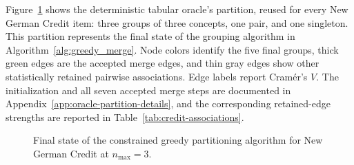 Figure~\ref{fig:german-credit-grouping-final} shows the deterministic tabular oracle's partition, reused for every New German Credit item: three groups of three concepts, one pair, and one singleton. This partition represents the final state of the grouping algorithm in Algorithm~\ref{alg:greedy_merge}. Node colors identify the five final groups, thick green edges are the accepted merge edges, and thin gray edges show other statistically retained pairwise associations. Edge labels report Cram\'er's $V$. The initialization and all seven accepted merge steps are documented in Appendix~\ref{app:oracle-partition-details}, and the corresponding retained-edge strengths are reported in Table~\ref{tab:credit-associations}.

\begin{figure}[htb]
  \centering
  
  \caption[Final oracle partition for New German Credit]{Final state of the constrained greedy partitioning algorithm for New German Credit at $n_{\max}=3$.}
  \label{fig:german-credit-grouping-final}
\end{figure}
